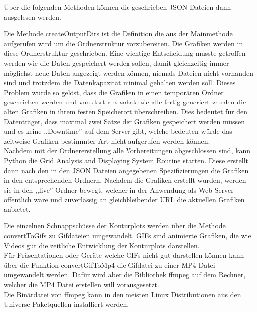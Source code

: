 Über die folgenden Methoden können die geschrieben JSON Dateien dann ausgelesen werden.

Die Methode createOutputDirs ist die Definition die aus der Mainmethode aufgerufen wird
um die Ordnerstruktur vorzubereiten. Die Grafiken werden in diese Ordnerstruktur geschrieben.
Eine wichtige Entscheidung musste getroffen werden wie die Daten gespeichert werden sollen,
damit gleichzeitig immer möglichst neue Daten angezeigt werden können, niemals Dateien nicht
vorhanden sind und trotzdem die Datenkapazität minimal gehalten werden soll.
Dieses Problem wurde so gelöst, dass die Grafiken in einen temporären Ordner geschrieben
werden und von dort aus sobald sie alle fertig generiert wurden die alten Grafiken in
ihrem festen Speicherort überschreiben. Dies bedeutet für den Datenträger, dass maximal
zwei Sätze der Grafiken gespeichert werden müssen und es keine ,,Downtime'' auf dem
Server gibt, welche bedeuten würde das zeitweise Grafiken bestimmter Art nicht aufgerufen
werden können.\\
Nachdem mit der Ordnererstellung alle Vorbereitungen abgeschlossen sind, kann Python die
Grid Analysis and Displaying System Routine starten. Diese erstellt dann nach den in den
JSON Dateien angegebenen Spezifizierungen die Grafiken in den entsprechenden Ordnern.
Nachdem die Grafiken erstellt wurden, werden sie in den ,,live'' Ordner bewegt, welcher
in der Anwendung als Web-Server öffentlich wäre und zuverlässig an gleichbleibender URL
die aktuellen Grafiken anbietet.

Die einzelnen Schnappschüsse der Konturplots werden über die Methode convertToGifs zu
Gifdateien umgewandelt. GIFs sind animierte Grafiken, die wie Videos gut die zeitliche
Entwicklung der Konturplots darstellen.\\
Für Präsentationen oder Geräte welche GIFs nicht gut darstellen können kann über die
Funktion convertGifToMp4 die Gifdatei zu einer MP4 Datei umgewandelt werden.
Dafür wird aber die Bibliothek ffmpeg auf dem Rechner, welcher die MP4 Datei erstellen
will vorausgesetzt.\\
Die Binärdatei von ffmpeg kann in den meisten Linux Distributionen aus den Universe-Paketquellen
installiert werden.

